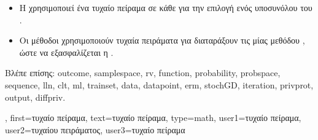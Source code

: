 {{\begin{itemize}
{			να ερμηνευτούν ως} , \foreignlanguage{greek}{δηλαδή ως}  \foreignlanguage{greek}{της} 
			 $\outcome \in \samplespace$ \foreignlanguage{greek}{ενός τυχαίου πειράματος.}
			\item \foreignlanguage{greek}{Η}  \foreignlanguage{greek}{χρησιμοποιεί ένα τυχαίο πείραμα σε κάθε} 
			 \foreignlanguage{greek}{για την επιλογή ενός υποσυνόλου του} . 
			\item \foreignlanguage{greek}{Οι μέθοδοι}  \foreignlanguage{greek}{χρησιμοποιούν τυχαία πειράματα 
			για διαταράξουν τις}  \foreignlanguage{greek}{μίας μεθόδου} ,
			\foreignlanguage{greek}{ώστε να εξασφαλίζεται η} . 
	 	\end{itemize} 
		\foreignlanguage{greek}{Βλέπε επίσης:} \gls{outcome}, \gls{samplespace}, \gls{rv}, \gls{function}, \gls{probability}, \gls{probspace}, \gls{sequence},
		\gls{lln}, \gls{clt}, \gls{ml}, \gls{trainset}, \gls{data}, \gls{datapoint}, \gls{erm}, \gls{stochGD}, \gls{iteration}, \gls{privprot}, \gls{output}, \gls{diffpriv}. },
 	first={\foreignlanguage{greek}{τυχαίο πείραμα}},
 	text={\foreignlanguage{greek}{τυχαίο πείραμα}},
	type=math,
	user1={\foreignlanguage{greek}{τυχαίο πείραμα}}, %
	user2={\foreignlanguage{greek}{τυχαίου πειράματος}}, %
	user3={\foreignlanguage{greek}{τυχαίο πεί\-ραμα}} %
}


